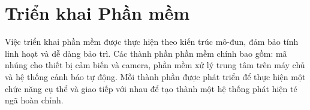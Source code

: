 \section{Triển khai Phần mềm}
\label{sec:software_implementation}

Việc triển khai phần mềm được thực hiện theo kiến trúc mô-đun, đảm bảo tính linh hoạt và dễ dàng bảo trì. Các thành phần phần mềm chính bao gồm: mã nhúng cho thiết bị cảm biến và camera, phần mềm xử lý trung tâm trên máy chủ và hệ thống cảnh báo tự động. Mỗi thành phần được phát triển để thực hiện một chức năng cụ thể và giao tiếp với nhau để tạo thành một hệ thống phát hiện té ngã hoàn chỉnh.





